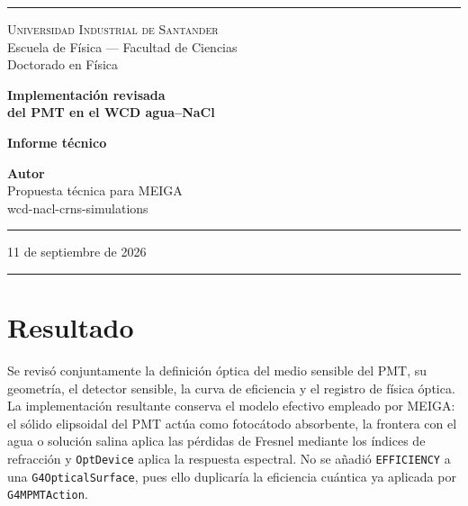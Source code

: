 \documentclass[11pt,a4paper]{article}
\begin{document}
\pagestyle{empty}


\begin{titlepage}
\begin{center}

\vspace*{0.5cm}
\textcolor{reglaColor}{\rule{\linewidth}{1.2pt}}

\vspace{1.3cm}
{\Large\scshape Universidad Industrial de Santander}\\[0.2cm]
{\large Escuela de Física --- Facultad de Ciencias}\\[0.2cm]
{\large Doctorado en Física}

\vspace{2.6cm}
{\Huge\bfseries\color{tituloColor} Implementación revisada\\[0.2cm]
del PMT en el WCD agua--NaCl}

\vspace{2.2cm}
{\large\textbf{Informe técnico}}

\vfill

{\large\textbf{Autor}}\\[0.15cm]
Propuesta técnica para MEIGA\\[0.1cm]
wcd-nacl-crns-simulations

\vspace{1.2cm}
\textcolor{reglaColor}{\rule{0.5\linewidth}{0.6pt}}

\vspace{1cm}
11 de septiembre de 2026

\vspace{1cm}
\textcolor{reglaColor}{\rule{\linewidth}{1.2pt}}

\end{center}
\end{titlepage}

\pagestyle{plain}

\section{Resultado}
Se revisó conjuntamente la definición óptica del medio sensible del PMT, su
geometría, el detector sensible, la curva de eficiencia y el registro de física
óptica. La implementación resultante conserva el modelo efectivo empleado por
MEIGA: el sólido elipsoidal del PMT actúa como fotocátodo absorbente, la frontera
con el agua o solución salina aplica las pérdidas de Fresnel mediante los índices
de refracción y \texttt{OptDevice} aplica la respuesta espectral. No se añadió
\texttt{EFFICIENCY} a una \texttt{G4OpticalSurface}, pues ello duplicaría la
eficiencia cuántica ya aplicada por \texttt{G4MPMTAction}.
\end{document}
